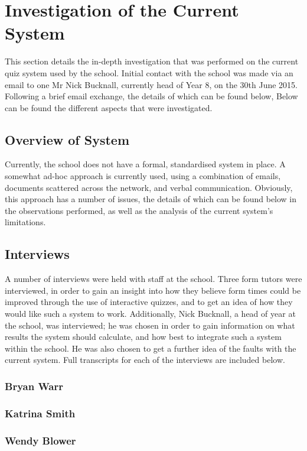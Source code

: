 \section{Investigation of the Current System}
This section details the in-depth investigation that was performed on the current quiz system used by the school. Initial contact with the school was made via an email to one Mr Nick Bucknall, currently head of Year 8, on the 30th June 2015. Following a brief email exchange, the details of which can be found below, Below can be found the different aspects that were investigated.

\subsection{Overview of System}
Currently, the school does not have a formal, standardised system in place. A somewhat ad-hoc approach is currently used, using a combination of emails, documents scattered across the network, and verbal communication. Obviously, this approach has a number of issues, the details of which can be found below in the observations performed, as well as the analysis of the current system's limitations.

\subsection{Interviews}
A number of interviews were held with staff at the school. Three form tutors were interviewed, in order to gain an insight into how they believe form times could be improved through the use of interactive quizzes, and to get an idea of how they would like such a system to work. Additionally, Nick Bucknall, a head of year at the school, was interviewed; he was chosen in order to gain information on what results the system should calculate, and how best to integrate such a system within the school. He was also chosen to get a further idea of the faults with the current system. Full transcripts for each of the interviews are included below.

\subsubsection{Bryan Warr}

\subsubsection{Katrina Smith}

\subsubsection{Wendy Blower}

